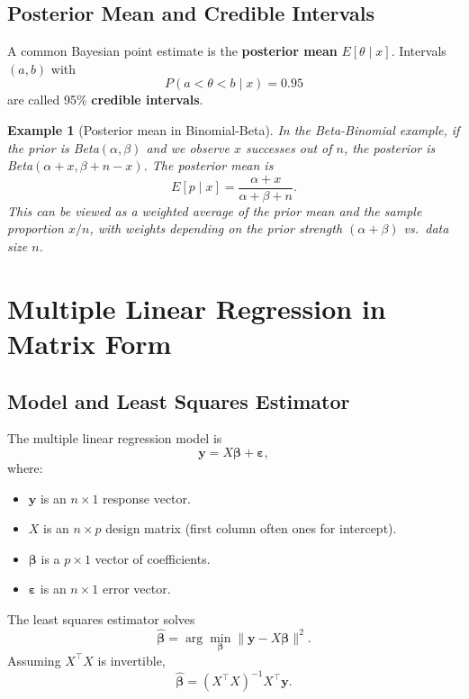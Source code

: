 \documentclass[11pt,a4paper]{article}
\newtheorem{example}{Example}[section]
\begin{document}
\subsection{Posterior Mean and Credible Intervals}

A common Bayesian point estimate is the \textbf{posterior mean} $E[\theta \mid x]$. 
Intervals $(a,b)$ with
\[
P(a < \theta < b \mid x) = 0.95
\]
are called 95\% \textbf{credible intervals}.

\begin{example}[Posterior mean in Binomial-Beta]
In the Beta-Binomial example, if the prior is Beta$(\alpha,\beta)$ and we observe $x$ successes out of $n$, the posterior is Beta$(\alpha+x,\beta+n-x)$. 
The posterior mean is
\[
E[p \mid x] = \frac{\alpha + x}{\alpha + \beta + n}.
\]
This can be viewed as a weighted average of the prior mean and the sample proportion $x/n$, with weights depending on the prior strength $(\alpha+\beta)$ vs.\ data size $n$.

\end{example}

\newpage

\section{Multiple Linear Regression in Matrix Form}

\subsection{Model and Least Squares Estimator}

The multiple linear regression model is
\[
\bm{y} = X\bm{\beta} + \bm{\varepsilon},
\]
where:
\begin{itemize}
    \item $\bm{y}$ is an $n \times 1$ response vector.
    \item $X$ is an $n \times p$ design matrix (first column often ones for intercept).
    \item $\bm{\beta}$ is a $p \times 1$ vector of coefficients.
    \item $\bm{\varepsilon}$ is an $n \times 1$ error vector.
\end{itemize}

The least squares estimator solves
\[
\hat{\bm{\beta}} = \arg\min_{\bm{\beta}} \|\bm{y} - X\bm{\beta}\|^2.
\]
Assuming $X^\top X$ is invertible,
\[
\hat{\bm{\beta}} = (X^\top X)^{-1} X^\top \bm{y}.
\]
\end{document}
